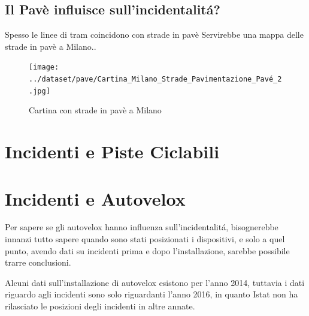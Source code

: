 \documentclass[a4paper]{report}
\begin{document}

\subsection{Il Pavè influisce sull'incidentalit\'a?}
Spesso le linee di tram coincidono con strade in pavè
Servirebbe una mappa delle strade in pavè a Milano..

\begin{figure}
    \texttt{[image: ../dataset/pave/Cartina\_Milano\_Strade\_Pavimentazione\_Pavé\_2.jpg]}
    \caption{Cartina con strade in pavè a Milano}
    \label{fig:pave_milano}
\end{figure}


\section{Incidenti e Piste  Ciclabili}

\section{Incidenti e Autovelox}

Per sapere se gli autovelox hanno influenza sull'incidentalit\'a, 
bisognerebbe innanzi tutto sapere quando sono stati posizionati i dispositivi, e solo a quel punto, 
avendo dati su incidenti prima e dopo l'installazione, sarebbe possibile trarre conclusioni.

Alcuni dati sull'installazione di autovelox esistono per l'anno 2014, tuttavia i dati 
riguardo agli incidenti sono solo riguardanti l'anno 2016, in quanto Istat non ha rilasciato 
le posizioni degli incidenti in altre annate.

\end{document}
